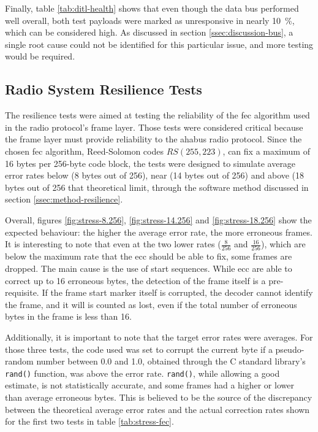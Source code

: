 Finally, table \ref{tab:ditl-health} shows that even though the data bus
performed well overall, both test payloads were marked as unresponsive in
nearly \SI{10}{\percent}, which can be considered high. As discussed in section
\ref{ssec:discussion-bus}, a single root cause could not be identified for this
particular issue, and more testing would be required.

\subsection{Radio System Resilience Tests}

The resilience tests were aimed at testing the reliability of the \acrlong{fec}
algorithm used in the radio protocol's frame layer. Those tests were considered
critical because the frame layer must provide reliability to the
\acrshort{ahabus} radio protocol. Since the chosen \acrshort{fec} algorithm,
Reed-Solomon codes $RS(255,223)$, can fix a maximum of 16 bytes per 256-byte
code block, the tests were designed to simulate average error rates below (8
bytes out of 256), near (14 bytes out of 256) and above (18 bytes out of 256
that theoretical limit, through the software method discussed in section
\ref{ssec:method-resilience}.

Overall, figures \ref{fig:stress-8.256}, \ref{fig:stress-14.256} and
\ref{fig:stress-18.256} show the expected behaviour: the higher the average
error rate, the more erroneous frames. It is interesting to note that even at
the two lower rates ($\frac{8}{256}$ and $\frac{16}{256}$), which are below
the maximum rate that the \acrlong{ecc} should be able to fix, some frames are
dropped. The main cause is the use of start sequences. While \acrshort{ecc} are
able to correct up to 16 erroneous bytes, the detection of the frame itself is a
pre-requisite. If the frame start marker itself is corrupted, the decoder cannot
identify the frame, and it will is counted as lost, even if the total number
of erroneous bytes in the frame is less than 16.

Additionally, it is important to note that the target error rates were averages.
For those three tests, the code used was set to corrupt the current byte if a
pseudo-random number between 0.0 and 1.0, obtained through the C standard
library's \texttt{rand()} function, was above the error rate. \texttt{rand()},
while allowing a good estimate, is not statistically accurate, and some frames
had a higher or lower than average erroneous bytes. This is believed to be the
source of the discrepancy between the theoretical average error rates and the
actual correction rates shown for the first two tests in table
\ref{tab:stress-fec}.

